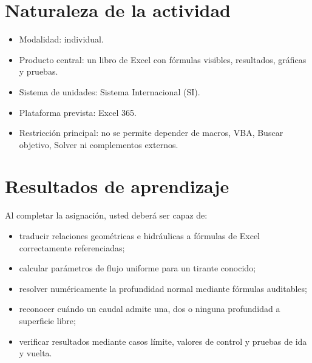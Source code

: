 \documentclass[12pt]{article}
\begin{document}

\section{Naturaleza de la actividad}
\begin{itemize}
\item Modalidad: individual.
\item Producto central: un libro de Excel con fórmulas visibles, resultados, gráficas y pruebas.
\item Sistema de unidades: Sistema Internacional (SI).
\item Plataforma prevista: Excel 365.
\item Restricción principal: no se permite depender de macros, VBA, Buscar objetivo, Solver ni complementos externos.
\end{itemize}


\section{Resultados de aprendizaje}
Al completar la asignación, usted deberá ser capaz de:
\begin{itemize}
\item traducir relaciones geométricas e hidráulicas a fórmulas de Excel correctamente referenciadas;
\item calcular parámetros de flujo uniforme para un tirante conocido;
\item resolver numéricamente la profundidad normal mediante fórmulas auditables;
\item reconocer cuándo un caudal admite una, dos o ninguna profundidad a superficie libre;
\item verificar resultados mediante casos límite, valores de control y pruebas de ida y vuelta.
\end{itemize}
\end{document}
